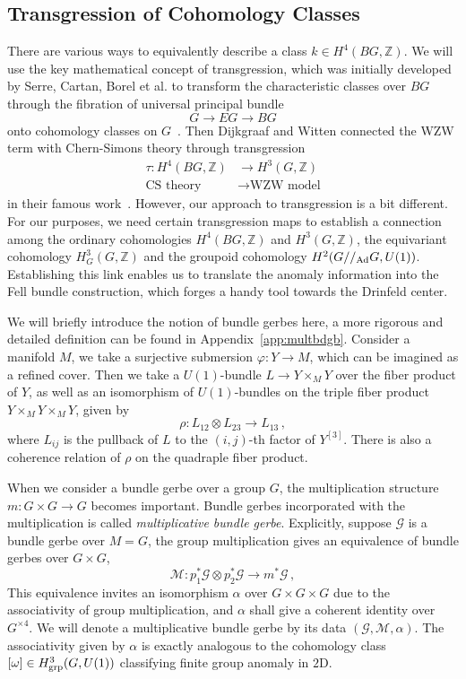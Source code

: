 \documentclass[a4paper,11pt]{article}
\newcommand{\be}{\begin{equation}}
\newcommand{\ee}{\end{equation}}
\newcommand{\ba}{\begin{aligned}}
\newcommand{\ea}{\end{aligned}}
\def\bbZ{\mathbb{Z}}
\def\gmg{G//_{\rm Ad} G}
\begin{document}
\subsection{Transgression of Cohomology Classes}

There are various ways to equivalently describe a class $k\in H^4(BG,\bbZ)$. We will use the key mathematical concept of transgression, which was initially developed by Serre, Cartan, Borel et al. to transform the characteristic classes over $BG$ through the fibration of universal principal bundle
\be  G \to EG \to BG \ee
onto cohomology classes on $G$~\cite{CartanSeminar:1948,PierreSerre:1951}. Then Dijkgraaf and Witten connected the WZW term with Chern-Simons theory through transgression
\be\ba \label{eq:ordinarytransgression} \tau: H^4(BG,\bbZ) &\to H^3(G,\bbZ) \\ \text{CS theory} &\to   \text{WZW model} \ea\ee
in their famous work~\cite{Dijkgraaf:1990}. However, our approach to transgression is a bit different. For our purposes, we need certain transgression maps to establish a connection among the ordinary cohomologies $H^4(BG,\bbZ)$ and $H^3(G,\bbZ)$, the equivariant cohomology $H^3_G(G,\bbZ)$ and the groupoid cohomology $H^2(\gmg,U(1))$. Establishing this link enables us to translate the anomaly information into the Fell bundle construction, which forges a handy tool towards the Drinfeld center.

We will briefly introduce the notion of bundle gerbes here, a more rigorous and detailed definition can be found in Appendix~\ref{app:multbdgb}. Consider a manifold $M$, we take a surjective submersion $\varphi:Y\to M$, which can be imagined as a refined cover. Then we take a $U(1)$-bundle $L\to Y\times_M Y$ over the fiber product of $Y$, as well as an isomorphism of $U(1)$-bundles on the triple fiber product $Y\times_M Y\times_MY$, given by
\be  \rho: L_{12} \otimes L_{23} \to  L_{13}\,, \ee
where $L_{i j}$ is the pullback of $L$ to the $(i,j)$-th factor of $Y^{[3]}$. There is also a coherence relation of $\rho$ on the quadraple fiber product.

When we consider a bundle gerbe over a group $G$, the multiplication structure $m:G\times G \to G$ becomes important. Bundle gerbes incorporated with the multiplication is called \emph{multiplicative bundle gerbe}. Explicitly, suppose $\mathscr{G}$ is a bundle gerbe over $M = G$, the group multiplication gives an equivalence of bundle gerbes over $G\times G$,
\be \mathscr{M}: p_1^* \mathscr{G} \otimes  p_2^* \mathscr{G}  \to m^*\mathscr{G}\,, \ee
This equivalence invites an isomorphism $\alpha$ over $G\times G\times G$ due to the associativity of group multiplication, and $\alpha$ shall give a coherent identity over $G^{\times 4}$. We will denote a multiplicative bundle gerbe by its data $(\mathscr{G},\mathscr{M},\alpha)$. The associativity given by $\alpha$ is exactly analogous to the cohomology class $[\omega]\in H^3_{\rm grp}(G,U(1))$ classifying finite group anomaly in $2$D.
\end{document}

